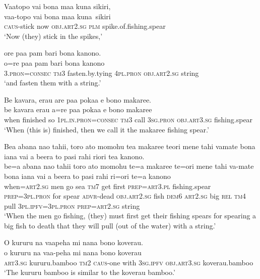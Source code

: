 \ea\label{ex:text6-18}
Vaatopo vai bona maa kuna sikiri,\\
\gll vaa-topo	vai	bona	maa	kuna~sikiri\\
     \textsc{caus}-stick	now	\textsc{obj}.\textsc{art}2.\textsc{sg}	\textsc{plm}	spike.of.fishing.spear\\
\glt `Now (they) stick in the spikes,'
\z

\ea\label{ex:text6-19}
ore paa pam bari bona kanono.\\
\gll o=re	paa	pam	bari	bona	kanono\\
     3.\textsc{pron}=\textsc{consec}	\textsc{tm}3	fasten.by.tying	4\textsc{pl}.\textsc{pron}	\textsc{obj}.\textsc{art}2.\textsc{sg}	string\\
\glt `and fasten them with a string.'
\z

\ea\label{ex:text6-20}
Be kavara, erau are paa pokaa e bono makaree.\\
\gll be	kavara	erau	a=re	paa	pokaa	e	bono	makaree\\
     when	finished	so	1\textsc{pl}.\textsc{in}.\textsc{pron}=\textsc{consec}	\textsc{tm}3	call	3\textsc{sg}.\textsc{pron}	\textsc{obj}.\textsc{art}3.\textsc{sg}	fishing.spear\\
\glt `When (this is) finished, then we call it the makaree fishing spear.'
\z

\ea\label{ex:text6-21}
Bea abana nao tahii, toro ato momohu tea makaree teori mene tahi vamate bona iana vai a beera to pasi rahi riori tea kanono.\\
\gll be=a	abana	nao	tahii	toro	ato	momohu	te=a	makaree	te=ori	mene	tahi	va-mate	bona	iana	vai	a	beera	to	pasi	rahi	ri=ori	te=a	kanono\\
     when=\textsc{art}2.\textsc{sg}	men	go	sea	\textsc{tm}7	get	first	\textsc{prep}=\textsc{art}3.\textsc{pl}	fishing.spear	\textsc{prep}=3\textsc{pl}.\textsc{pron}	for	spear	\textsc{advr}-dead	\textsc{obj}.\textsc{art}2.\textsc{sg}	fish	\textsc{dem}6	\textsc{art}2.\textsc{sg}	big	\textsc{rel}	\textsc{tm}4	pull	3\textsc{pl}.\textsc{ipfv}=3\textsc{pl}.\textsc{pron}	\textsc{prep}=\textsc{art}2.\textsc{sg}	string\\
\glt `When the men go fishing, (they) must first get their fishing spears for spearing a big fish to death that they will pull (out of the water) with a string.'
\z

\ea\label{ex:text6-22}
O kururu na vaapeha mi nana bono koverau.\\
\gll o	kururu	na	vaa-peha	mi	nana	bono	koverau\\
     \textsc{art}3.\textsc{sg}	kururu.bamboo	\textsc{tm}2	\textsc{caus}-one	with	3\textsc{sg}.\textsc{ipfv}	\textsc{obj}.\textsc{art}3.\textsc{sg}	koverau.bamboo\\
\glt `The kururu bamboo is similar to the koverau bamboo.'
\z

